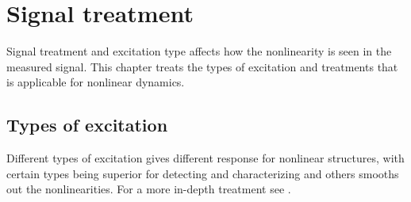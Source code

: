 
\chapter{Signal treatment}
\label{cha:signal-treatment}

Signal treatment and excitation type affects how the nonlinearity is seen in the
measured signal.
This chapter treats the types of excitation and treatments that
is applicable for nonlinear dynamics.

\section{Types of excitation}
\label{sec:types-excitation}

Different types of excitation gives different response for nonlinear structures,
with certain types being superior for detecting and characterizing and others
smooths out the nonlinearities. For a more in-depth treatment see
\citep{gatto2010flexible}.


